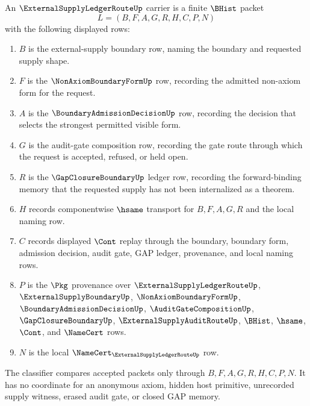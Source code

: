\begin{definition}
\label{def:external-supply-ledger-route-carrier}
An $\ExternalSupplyLedgerRouteUp$ carrier is a finite $\BHist$ packet
$$
L=(B,F,A,G,R,H,C,P,N)
$$
with the following displayed rows:
\begin{enumerate}
\item $B$ is the external-supply boundary row, naming the boundary and requested supply shape.
\item $F$ is the $\NonAxiomBoundaryFormUp$ row, recording the admitted non-axiom form for the request.
\item $A$ is the $\BoundaryAdmissionDecisionUp$ row, recording the decision that selects the strongest permitted visible form.
\item $G$ is the audit-gate composition row, recording the gate route through which the request is accepted, refused, or held open.
\item $R$ is the $\GapClosureBoundaryUp$ ledger row, recording the forward-binding memory that the requested supply has not been internalized as a theorem.
\item $H$ records componentwise $\hsame$ transport for $B,F,A,G,R$ and the local naming row.
\item $C$ records displayed $\Cont$ replay through the boundary, boundary form, admission decision, audit gate, GAP ledger, provenance, and local naming rows.
\item $P$ is the $\Pkg$ provenance over $\ExternalSupplyLedgerRouteUp$, $\ExternalSupplyBoundaryUp$, $\NonAxiomBoundaryFormUp$, $\BoundaryAdmissionDecisionUp$, $\AuditGateCompositionUp$, $\GapClosureBoundaryUp$, $\ExternalSupplyAuditRouteUp$, $\BHist$, $\hsame$, $\Cont$, and $\NameCert$ rows.
\item $N$ is the local $\NameCert_{\ExternalSupplyLedgerRouteUp}$ row.
\end{enumerate}
The classifier compares accepted packets only through $B,F,A,G,R,H,C,P,N$. It has no coordinate for an anonymous axiom, hidden host primitive, unrecorded supply witness, erased audit gate, or closed GAP memory.
\end{definition}

